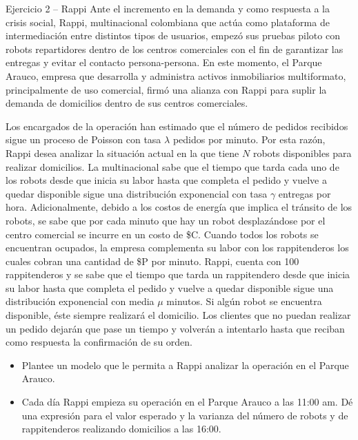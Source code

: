 \documentclass[aspectratio=1610, 9pt]{beamer}
\begin{document}
\begin{frame}{Ejercicio 2 -- Rappi}
\footnotesize
Ante el incremento en la demanda y como respuesta a la crisis social, Rappi, multinacional colombiana que actúa como plataforma de intermediación entre distintos tipos de usuarios, empezó sus pruebas piloto con robots repartidores dentro de los centros comerciales con el fin de garantizar las entregas y evitar el contacto persona-persona. En este momento, el Parque Arauco, empresa que desarrolla y administra activos inmobiliarios multiformato, principalmente de uso comercial, firmó una alianza con Rappi para suplir la demanda de domicilios dentro de sus centros comerciales.

\medskip
Los encargados de la operación han estimado que el número de pedidos recibidos sigue un proceso de Poisson con tasa $\lambda$ pedidos por minuto. Por esta razón, Rappi desea analizar la situación actual en la que tiene $N$ robots disponibles para realizar domicilios. La multinacional sabe que el tiempo que tarda cada uno de los robots desde que inicia su labor hasta que completa el pedido y vuelve a quedar disponible sigue una distribución exponencial con tasa $\gamma$ entregas por hora. Adicionalmente, debido a los costos de energía que implica el tránsito de los robots, se sabe que por cada minuto que hay un robot desplazándose por el centro comercial se incurre en un costo de \$C. Cuando todos los robots se encuentran ocupados, la empresa complementa su labor con los rappitenderos los cuales cobran una cantidad de \$P por minuto. Rappi, cuenta con 100 rappitenderos y se sabe que el tiempo que tarda un rappitendero desde que inicia su labor hasta que completa el pedido y vuelve a quedar disponible sigue una distribución exponencial con media $\mu$ minutos. Si algún robot se encuentra disponible, éste siempre realizará el domicilio. Los clientes que no puedan realizar un pedido dejarán que pase un tiempo y volverán a intentarlo hasta que reciban como respuesta la confirmación de su orden.

\medskip
\begin{itemize}
    \item Plantee un modelo que le permita a Rappi analizar la operación en el Parque Arauco.
    \item Cada día Rappi empieza su operación en el Parque Arauco a las 11:00 am. Dé una expresión para el valor esperado y la varianza del número de robots y de rappitenderos realizando domicilios a las 16:00.
\end{itemize}
\end{frame}
\end{document}

